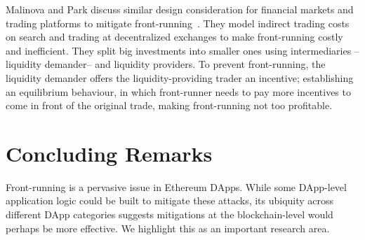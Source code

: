 Malinova and Park discuss similar design consideration for financial markets and trading platforms to mitigate front-running~\cite{malinova2017market}. They model indirect trading costs on search and trading at decentralized exchanges to make front-running costly and inefficient. They split big investments into smaller ones using intermediaries --liquidity demander-- and liquidity providers. To prevent front-running, the liquidity demander offers the liquidity-providing trader an incentive; establishing an equilibrium behaviour, in which front-runner needs to pay more incentives to come in front of the original trade, making front-running not too profitable.





\section{Concluding Remarks}

Front-running is a pervasive issue in Ethereum DApps. While some DApp-level application logic could be built to mitigate these attacks, its ubiquity across different DApp categories suggests mitigations at the blockchain-level would perhaps be more effective. We highlight this as an important research area.

